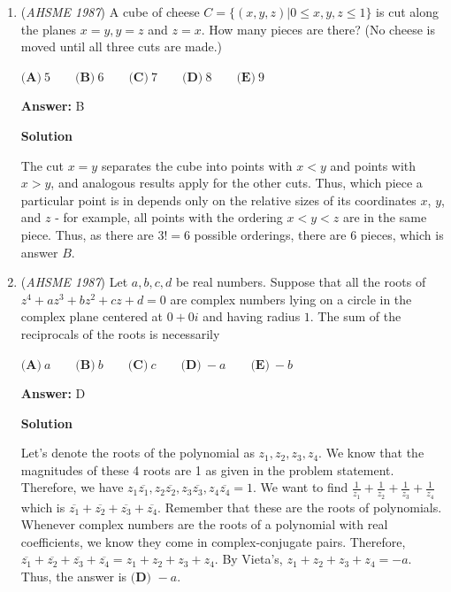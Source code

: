 \begin{enumerate}
 


	\item (\textit{AHSME 1987}) A cube of cheese $C=\{(x, y, z)| 0 \le x, y, z \le 1\}$ is cut along the planes $x=y, y=z$ and $z=x$. How many pieces are there? 
(No cheese is moved until all three cuts are made.)


 $\textbf{(A)}\ 5 \qquad \textbf{(B)}\ 6 \qquad \textbf{(C)}\ 7 \qquad \textbf{(D)}\ 8 \qquad \textbf{(E)}\ 9$

 \textbf{Answer: }B



\textbf{Solution}

The cut $x = y$ separates the cube into points with $x < y$ and points with $x > y$, and analogous results apply for the other cuts. Thus, which piece a particular point is in depends only on the relative sizes of its coordinates $x$, $y$, and $z$ - for example, all points with the ordering $x < y < z$ are in the same piece. Thus, as there are $3! = 6$ possible orderings, there are $6$ pieces, which is answer $\boxed{B}$.

 


	\item (\textit{AHSME 1987}) Let $a, b, c, d$ be real numbers. Suppose that all the roots of $z^4+az^3+bz^2+cz+d=0$ are complex numbers lying on a circle
in the complex plane centered at $0+0i$ and having radius $1$. The sum of the reciprocals of the roots is necessarily


 $\textbf{(A)}\ a \qquad \textbf{(B)}\ b \qquad \textbf{(C)}\ c \qquad \textbf{(D)}\ -a \qquad \textbf{(E)}\ -b$

 \textbf{Answer: }D



\textbf{Solution}

Let's denote the roots of the polynomial as $z_1, z_2, z_3, z_4$. We know that the magnitudes of these 4 roots are 1 as given in the problem statement. Therefore, we have $z_1 \overline{z_1}, z_2 \overline{z_2}, z_3 \overline{z_3}, z_4 \overline{z_4} = 1$. We want to find $\frac{1}{z_1} + \frac{1}{z_2} + \frac{1}{z_3} + \frac{1}{z_4}$ which is $\overline{z_1} + \overline{z_2} + \overline{z_3} + \overline{z_4}$. Remember that these are the roots of polynomials. Whenever complex numbers are the roots of a polynomial with real coefficients, we know they come in complex-conjugate pairs. Therefore, $\overline{z_1} + \overline{z_2} + \overline{z_3} + \overline{z_4} = z_1 + z_2 + z_3 + z_4$. By Vieta's, $z_1 + z_2 + z_3 + z_4 = -a$. Thus, the answer is $\boxed{\textbf{(D) } -a }$. 


\end{enumerate}
